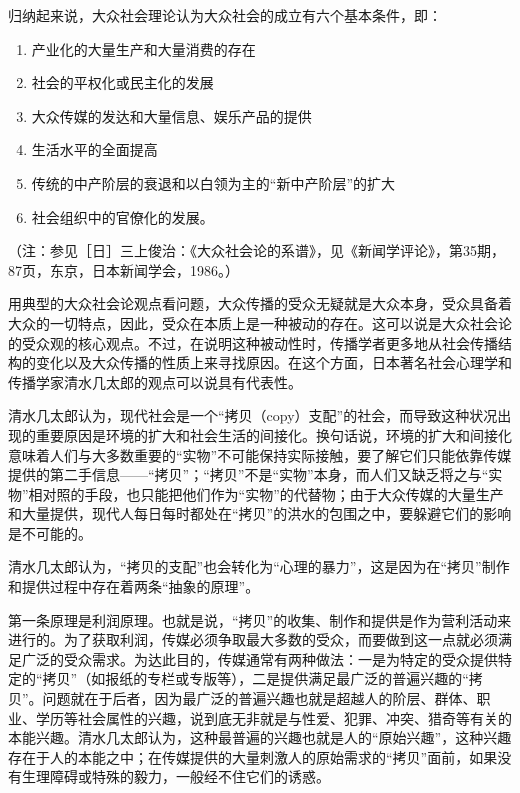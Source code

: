\documentclass[UTF8,12pt]{ctexart}
\numberwithin{equation}{section} %
\numberwithin{figure}{section}
\numberwithin{table}{section}
\begin{document}
	归纳起来说，大众社会理论认为大众社会的成立有六个基本条件，即：
	\begin{enumerate}
		\item 产业化的大量生产和大量消费的存在
		
		\item 社会的平权化或民主化的发展
		
		\item 大众传媒的发达和大量信息、娱乐产品的提供
		
		\item 生活水平的全面提高
		
		\item 传统的中产阶层的衰退和以白领为主的“新中产阶层”的扩大
		
		\item 社会组织中的官僚化的发展。
	\end{enumerate}
	（注：参见［日］三上俊治：《大众社会论的系谱》，见《新闻学评论》，第35期，87页，东京，日本新闻学会，1986。）
	
	
	用典型的大众社会论观点看问题，大众传播的受众无疑就是大众本身，受众具备着大众的一切特点，因此，受众在本质上是一种被动的存在。这可以说是大众社会论的受众观的核心观点。不过，在说明这种被动性时，传播学者更多地从社会传播结构的变化以及大众传播的性质上来寻找原因。在这个方面，日本著名社会心理学和传播学家清水几太郎的观点可以说具有代表性。
	
	清水几太郎认为，现代社会是一个“拷贝（copy）支配”的社会，而导致这种状况出现的重要原因是环境的扩大和社会生活的间接化。换句话说，环境的扩大和间接化意味着人们与大多数重要的“实物”不可能保持实际接触，要了解它们只能依靠传媒提供的第二手信息——“拷贝”；“拷贝”不是“实物”本身，而人们又缺乏将之与“实物”相对照的手段，也只能把他们作为“实物”的代替物；由于大众传媒的大量生产和大量提供，现代人每日每时都处在“拷贝”的洪水的包围之中，要躲避它们的影响是不可能的。
	
	清水几太郎认为，“拷贝的支配”也会转化为“心理的暴力”，这是因为在“拷贝”制作和提供过程中存在着两条“抽象的原理”。
	
	第一条原理是利润原理。也就是说，“拷贝”的收集、制作和提供是作为营利活动来进行的。为了获取利润，传媒必须争取最大多数的受众，而要做到这一点就必须满足广泛的受众需求。为达此目的，传媒通常有两种做法：一是为特定的受众提供特定的“拷贝”（如报纸的专栏或专版等），二是提供满足最广泛的普遍兴趣的“拷贝”。问题就在于后者，因为最广泛的普遍兴趣也就是超越人的阶层、群体、职业、学历等社会属性的兴趣，说到底无非就是与性爱、犯罪、冲突、猎奇等有关的本能兴趣。清水几太郎认为，这种最普遍的兴趣也就是人的“原始兴趣”，这种兴趣存在于人的本能之中；在传媒提供的大量刺激人的原始需求的“拷贝”面前，如果没有生理障碍或特殊的毅力，一般经不住它们的诱惑。
	
\end{document}
